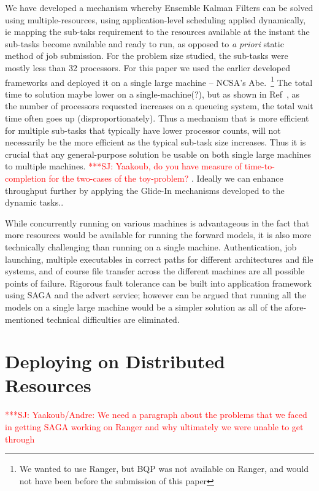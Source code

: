 \documentclass[conference,final]{IEEEtran}
\newcommand{\jhanote}[1]{ {\textcolor{red} { ***SJ: #1 }}}
\newcommand{\jhanote}[1]{}
\begin{document}
We have developed a mechanism whereby Ensemble Kalman Filters can be
solved using multiple-resources, using application-level scheduling
applied dynamically, ie mapping the sub-taks requirement to the
resources available at the instant the sub-tasks become available and
ready to run, as opposed to {\it a priori} static method of job
submission. For the problem size studied, the sub-tasks were mostly
less than 32 processors. For this paper we used the earlier developed
frameworks and deployed it on a single large machine -- NCSA's
Abe.~\footnote{We wanted to use Ranger, but BQP was not available on
  Ranger, and would not have been before the submission of this paper}
The total time to solution maybe lower on a single-machine(?), but as
shown in Ref~\cite{novelsubmissionmode}, as the number of processors
requested increases on a queueing system, the total wait time often
goes up (disproportionately). Thus a mechanism that is more efficient
for multiple sub-tasks that typically have lower processor counts,
will not necessarily be the more efficient as the typical sub-task
size increases. Thus it is crucial that any general-purpose solution
be usable on both single large machines to multiple machines.
\jhanote{Yaakoub, do you have measure of time-to-completion for the
  two-cases of the toy-problem?}. Ideally we can enhance throughput
further by applying the Glide-In mechanisms developed to the dynamic
tasks..


While concurrently running on various machines is advantageous in the
fact that more resources would be available for running the forward
models, it is also more technically challenging than running on a
single machine.  Authentication, job launching, multiple executables
in correct paths for different architectures and file systems, and of
course file transfer across the different machines are all possible
points of failure. Rigorous fault tolerance can be built into
application framework using SAGA and the advert service; however can
be argued that running all the models on a single large machine would
be a simpler solution as all of the afore-mentioned technical
difficulties are eliminated.

\section{Deploying on Distributed Resources}

\jhanote{Yaakoub/Andre: We need a paragraph about the problems that we
  faced in getting SAGA working on Ranger and why ultimately we were
  unable to get through}
\end{document}
